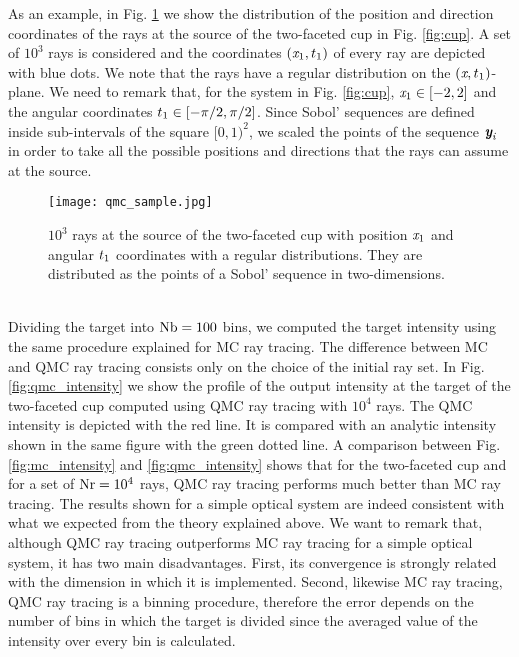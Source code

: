 As an example, in Fig. \ref{fig:qmc_sample} we show the distribution of the position and direction coordinates of the rays at the source of the two-faceted cup in Fig. \ref{fig:cup}. 
A set of $10^3$ rays is considered and the coordinates $(\textit{x}_1, t_1)$ of every ray are depicted with blue dots.
We note that the rays have a regular distribution on the $(\textit{x}, t_1)$-plane.
We need to remark that, for the system in Fig. \ref{fig:cup}, $\textit{x}_1 \in[-2,2]$ and the angular coordinates $t_1 \in[-\pi/2, \pi/2]$. 
Since Sobol' sequences are defined inside sub-intervals of the square $[0,1)^2$, we scaled the points of the sequence $\textit{\textbf{y}}_{\textit{i}}$ in order to take all the possible positions and directions that the rays can assume at the source. 
\begin{figure}[h]
\begin{center}
    \texttt{[image: qmc\_sample.jpg]}
    \caption{$10^3$ rays at the source of the two-faceted cup with position $\textit{x}_1$ and angular $t_1$ coordinates with a regular distributions.
They are distributed as the points of a Sobol' sequence in two-dimensions.}
    \label{fig:qmc_sample}
\end{center}
  \end{figure}
\\ \indent Dividing the target into $\textrm{Nb}=100$ bins, we computed the target intensity using the same procedure explained for MC ray tracing. 
The difference between MC and QMC ray tracing consists only on the choice of the initial ray set.
In Fig. \ref{fig:qmc_intensity} we show the profile of the output intensity at the target of the two-faceted cup computed using QMC ray tracing with $10^4$ rays. 
The QMC intensity is depicted with the red line. It is compared with an analytic intensity shown in the same figure with the green dotted line.
A comparison between Fig. \ref{fig:mc_intensity} and \ref{fig:qmc_intensity} shows that for the two-faceted cup and for a set of $\textrm{Nr}=10^4$ rays, QMC ray tracing performs much better than MC ray tracing. The results shown for a simple optical system are indeed consistent with what we expected from the theory explained above.
We want to remark that, although QMC ray tracing outperforms MC ray tracing for a simple optical system, it has two main disadvantages. 
First, its convergence is strongly related with the dimension in which it is implemented.
Second, likewise MC ray tracing, QMC ray tracing is a binning procedure, therefore the error depends on the number of bins in which the target is divided since the averaged value of the intensity over every bin is calculated.
